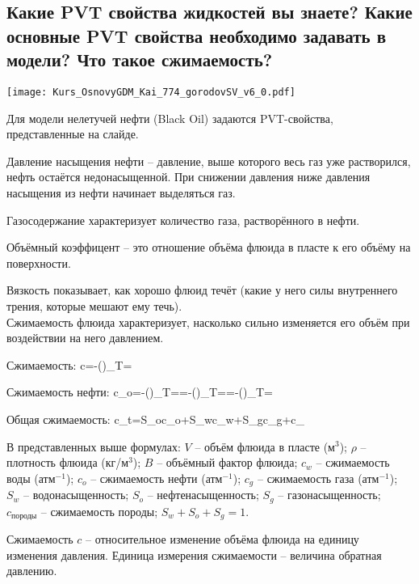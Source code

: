 

\subsection{Какие PVT свойства жидкостей вы знаете? Какие основные PVT свойства необходимо задавать в модели? Что такое сжимаемость?}

\texttt{[image: Kurs\_OsnovyGDM\_Kai\_774\_gorodovSV\_v6\_0.pdf]}

Для модели нелетучей нефти (Black Oil) задаются PVT-свойства, представленные на слайде.

Давление насыщения нефти -- давление, выше которого весь газ уже растворился, нефть остаётся недонасыщенной.
При снижении давления ниже давления насыщения из нефти начинает выделяться газ.

Газосодержание характеризует количество газа, растворённого в нефти.

Объёмный коэффицент -- это отношение объёма флюида в пласте к его объёму на поверхности.

Вязкость показывает, как хорошо флюид течёт (какие у него силы внутреннего трения, которые мешают ему течь).
\\

Сжимаемость флюида характеризует, насколько сильно изменяется его объём при воздействии на него давлением.

Сжимаемость:
\beq
c=-\left(\right)_{T=}
\eeq

Сжимаемость нефти:
\beq
c_o=-\left(\right)_{T=}=-\left(\right)_{T=}=-\left(\right)_{T=}
\eeq

Общая сжимаемость:
\beq
c_t=S_oc_o+S_wc_w+S_gc_g+c_{}
\eeq

В представленных выше формулах:
$V$ -- объём флюида в пласте (м$^3$);
$\rho$ -- плотность флюида (кг/м$^3$);
$B$ -- объёмный фактор флюида;
$c_w$ -- сжимаемость воды (атм$^{-1}$);
$c_o$ -- сжимаемость нефти (атм$^{-1}$);
$c_g$ -- сжимаемость газа (атм$^{-1}$);
$S_w$ -- водонасыщенность;
$S_o$ -- нефтенасыщенность;
$S_g$ -- газонасыщенность;
$c_\text{породы}$ -- сжимаемость породы;
$S_w+S_o+S_g=1$.

Сжимаемость $c$ -- относительное изменение объёма флюида на единицу изменения давления.
Единица измерения сжимаемости -- величина обратная давлению.
\\

